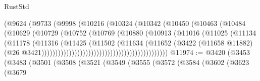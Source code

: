 \begin{lexlean}{RustStd}
\begin{coremodule}
                                            (@9624
                                              (@9733
                                                (@9998
                                                  (@10216
                                                    (@10324
                                                      (@10342
                                                        (@10450
                                                          (@10463
                                                            (@10484
                                                              (@10629
                                                                (@10729
                                                                  (@10752
                                                                    (@10769
                                                                      (@10880
                                                                        (@10913
                                                                          (@11016
                                                                            (@11025
                                                                              (@11134
                                                                                (@11178
                                                                                  (@11316
                                                                                    (@11425
                                                                                      (@11502
                                                                                        (@11634
                                                                                          (@11652
                                                                                            (@3422
                                                                                              (@11658
                                                                                                @11882)
                                                                                              (@26
                                                                                                @3421))))))))))))))))))))))))))))))))))))))))))))))
@11974 := @3420
    (@3453
      (@3483
        (@3501
          (@3508
            (@3521
              (@3549
                (@3555
                  (@3572
                    (@3584
                      (@3602
                        (@3623
                          (@3679

\end{coremodule}
\end{lexlean}

